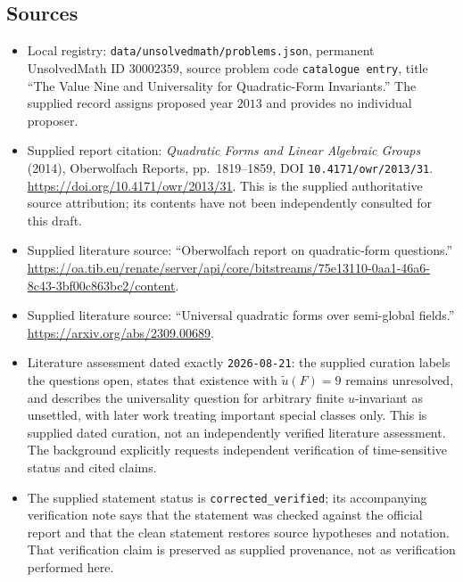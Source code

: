 \documentclass[11pt]{article}
\begin{document}
\subsection{Sources}
\begin{itemize}
\item Local registry: \texttt{data/unsolvedmath/problems.json}, permanent UnsolvedMath ID \(30002359\), source problem code \texttt{catalogue entry}, title ``The Value Nine and Universality for Quadratic-Form Invariants.'' The supplied record assigns proposed year \(2013\) and provides no individual proposer.
\item Supplied report citation: \emph{Quadratic Forms and Linear Algebraic Groups} (2014), Oberwolfach Reports, pp.\ 1819--1859, DOI \texttt{10.4171/owr/2013/31}. \url{https://doi.org/10.4171/owr/2013/31}. This is the supplied authoritative source attribution; its contents have not been independently consulted for this draft.
\item Supplied literature source: ``Oberwolfach report on quadratic-form questions.'' \url{https://oa.tib.eu/renate/server/api/core/bitstreams/75e13110-0aa1-46a6-8c43-3bf00c863bc2/content}.
\item Supplied literature source: ``Universal quadratic forms over semi-global fields.'' \url{https://arxiv.org/abs/2309.00689}.
\item Literature assessment dated exactly \texttt{2026-08-21}: the supplied curation labels the questions open, states that existence with \(\widetilde u(F)=9\) remains unresolved, and describes the universality question for arbitrary finite \(u\)-invariant as unsettled, with later work treating important special classes only. This is supplied dated curation, not an independently verified literature assessment. The background explicitly requests independent verification of time-sensitive status and cited claims.
\item The supplied statement status is \texttt{corrected\_verified}; its accompanying verification note says that the statement was checked against the official report and that the clean statement restores source hypotheses and notation. That verification claim is preserved as supplied provenance, not as verification performed here.
\end{itemize}
\end{document}
